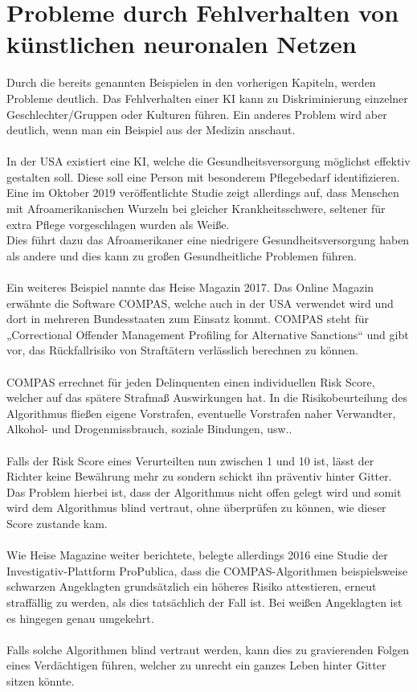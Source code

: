 \documentclass[12pt,oneside,a4paper,parskip]{scrbook}
\begin{document}
\section{Probleme durch Fehlverhalten von künstlichen neuronalen Netzen}
Durch die bereits genannten Beispielen in den vorherigen Kapiteln, werden Probleme deutlich. Das Fehlverhalten einer KI kann zu Diskriminierung einzelner Geschlechter/Gruppen oder Kulturen führen. Ein anderes Problem wird aber deutlich, wenn man ein Beispiel aus der Medizin anschaut.
\\\\
In der USA existiert eine KI, welche die Gesundheitsversorgung möglichst effektiv gestalten soll. Diese soll eine Person mit besonderem Pflegebedarf identifizieren. Eine im Oktober 2019 veröffentlichte Studie zeigt allerdings auf, dass Menschen mit Afroamerikanischen Wurzeln bei gleicher Krankheitsschwere, seltener für extra Pflege vorgeschlagen wurden als Weiße\cite{Gesundheitsversorgung}. \\
Dies führt dazu das Afroamerikaner eine niedrigere Gesundheitsversorgung haben als andere und dies kann zu großen Gesundheitliche Problemen führen.
\\\\
Ein weiteres Beispiel nannte das Heise Magazin 2017\cite{heise}. Das Online Magazin erwähnte die Software COMPAS, welche auch in der USA verwendet wird und dort in mehreren Bundesstaaten zum Einsatz kommt. COMPAS steht für „Correctional Offender Management Profiling for Alternative Sanctions“ und gibt vor, das Rückfallrisiko von Straftätern verlässlich berechnen zu können.
\\\\
COMPAS errechnet für jeden Delinquenten einen individuellen Risk Score, welcher auf das spätere Strafmaß Auswirkungen hat.
In die Risikobeurteilung des Algorithmus fließen eigene Vorstrafen, eventuelle Vorstrafen naher Verwandter, Alkohol- und Drogenmissbrauch, soziale Bindungen, usw..
\\\\
Falls der Risk Score eines Verurteilten nun zwischen 1 und 10 ist, lässt der Richter keine Bewährung mehr zu sondern schickt ihn präventiv hinter Gitter.
Das Problem hierbei ist, dass der Algorithmus nicht offen gelegt wird und somit wird dem Algorithmus blind vertraut, ohne überprüfen zu können, wie dieser Score zustande kam.
\\\\
Wie Heise Magazine weiter berichtete, belegte allerdings 2016 eine Studie der Investigativ-Plattform ProPublica, dass die COMPAS-Algorithmen beispielsweise schwarzen Angeklagten grundsätzlich ein höheres Risiko attestieren, erneut straffällig zu werden, als dies tatsächlich der Fall ist. Bei weißen Angeklagten ist es hingegen genau umgekehrt.
\\\\
Falls solche Algorithmen blind vertraut werden, kann dies zu gravierenden Folgen eines Verdächtigen führen, welcher zu unrecht ein ganzes Leben hinter Gitter sitzen könnte.
\end{document}
